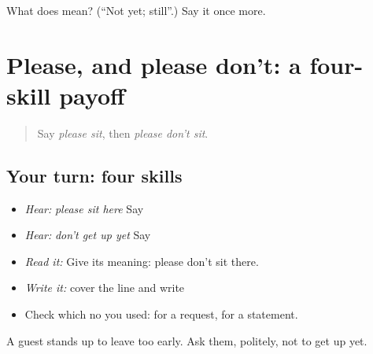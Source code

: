 \begin{tcolorbox}[breakable,colback=teal!4,colframe=teal!35!black,title={Before you move on}]
What does \textbf{} mean? (\textquotedblleft{}Not yet; still\textquotedblright{}.) Say it once more.
\end{tcolorbox}
\section[\texorpdfstring{\pa{ਅਜੇ} \pa{ਨਾ} \pa{ਉੱਠੋ।} (aje nā uṭṭho.)}{ਅਜੇ ਨਾ ਉੱਠੋ। (aje nā uṭṭho.)}]{Please, and please don't: a four-skill payoff}

\label{lesson:PA-C213-payoff}



\begin{quote}
Say \emph{please sit}, then \emph{please don't sit}.
\end{quote}

\subsection*{Your turn: four skills}
\begin{itemize}
\raggedright
  \item \emph{Hear:} \emph{please sit here} Say \textbf{ }
  \item \emph{Hear:} \emph{don't get up yet} Say \textbf{  }
  \item \emph{Read it:} \textbf{  } Give its meaning: please don't sit there.
  \item \emph{Write it:} cover the line and write \textbf{  }
  \item Check which no you used: \textbf{} for a request, \textbf{} for a statement.
\end{itemize}

\begin{tcolorbox}[breakable,colback=teal!4,colframe=teal!35!black,title={Before you move on}]
A guest stands up to leave too early. Ask them, politely, not to get up yet.
\end{tcolorbox}
